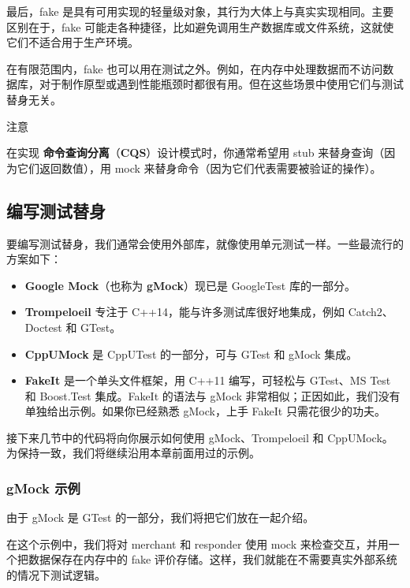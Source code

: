 最后，fake 是具有可用实现的轻量级对象，其行为大体上与真实实现相同。主要区别在于，fake 可能走各种捷径，比如避免调用生产数据库或文件系统，这就使它们不适合用于生产环境。

在有限范围内，fake 也可以用在测试之外。例如，在内存中处理数据而不访问数据库，对于制作原型或遇到性能瓶颈时都很有用。但在这些场景中使用它们与测试替身无关。

\begin{myNotic}{注意}

\label{idx:844}
在实现 \textbf{命令查询分离}（\textbf{CQS}）设计模式时，你通常希望用 stub 来替身查询（因为它们返回数值），用 mock 来替身命令（因为它们代表需要被验证的操作）。
\end{myNotic}

\subsection{编写测试替身}

\label{idx:845}
要编写测试替身，我们通常会使用外部库，就像使用单元测试一样。一些最流行的方案如下：

\begin{itemize}
\label{idx:846}
\item \textbf{Google Mock}（也称为 \textbf{gMock}）现已是 GoogleTest 库的一部分。
\label{idx:847}
\item \textbf{Trompeloeil} 专注于 C++14，能与许多测试库很好地集成，例如 Catch2、Doctest 和 GTest。
\label{idx:848}
\item \textbf{CppUMock} 是 CppUTest 的一部分，可与 GTest 和 gMock 集成。
\label{idx:849}
\item \textbf{FakeIt} 是一个单头文件框架，用 C++11 编写，可轻松与 GTest、MS Test 和 Boost.Test 集成。FakeIt 的语法与 gMock 非常相似；正因如此，我们没有单独给出示例。如果你已经熟悉 gMock，上手 FakeIt 只需花很少的功夫。
\end{itemize}

接下来几节中的代码将向你展示如何使用 gMock、Trompeloeil 和 CppUMock。为保持一致，我们将继续沿用本章前面用过的示例。

\subsubsection{gMock 示例}

\label{idx:850}
由于 gMock 是 GTest 的一部分，我们将把它们放在一起介绍。

\label{idx:851}
在这个示例中，我们将对 merchant 和 responder 使用 mock 来检查交互，并用一个把数据保存在内存中的 fake 评价存储。这样，我们就能在不需要真实外部系统的情况下测试逻辑。

